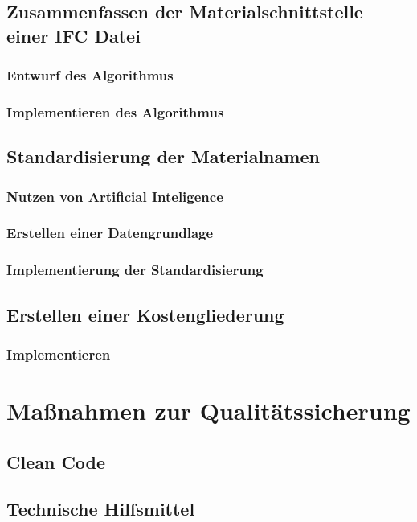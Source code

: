 \subsection{Zusammenfassen der Materialschnittstelle einer IFC Datei}
\subsubsection{Entwurf des Algorithmus}
\subsubsection{Implementieren des Algorithmus}

\subsection{Standardisierung der Materialnamen}
\subsubsection{Nutzen von Artificial Inteligence}

\subsubsection{Erstellen einer Datengrundlage}
\subsubsection{Implementierung der Standardisierung}

\subsection{Erstellen einer Kostengliederung}
\subsubsection{Implementieren}

\newpage
\section{Maßnahmen zur Qualitätssicherung}
\label{s:qs}
\subsection{Clean Code}
\label{s:qs:cleancode}
\subsection{Technische Hilfsmittel}
\label{s:qs:technical_aids}
